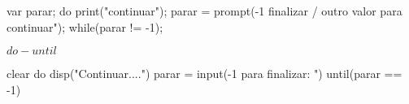 \documentclass[a4paper,11pt]{article}
\def\lthtmlcheckvsize{\ifdim\ht\sizebox<\vsize 
  \ifdim\wd\sizebox<\hsize\expandafter\hfill\fi \expandafter\vfill
  \else\expandafter\vss\fi}%
\begin{document}
{\newpage\clearpage
{}%
\begin{code}
var parar;
do{
	print("continuar");
	parar = prompt(-1 finalizar / outro valor para continuar");
}
while(parar != -1);
\end{code}%
\lthtmlfigureZ
\lthtmlcheckvsize\clearpage}

{\newpage\clearpage
{}%
$do-until$%
\lthtmlindisplaymathZ
\lthtmlcheckvsize\clearpage}

{\newpage\clearpage
{}%
\begin{code}
clear
do
  disp("Continuar....")
  parar = input(-1 para finalizar: ")
until(parar == -1)
\end{code}%
\lthtmlfigureZ
\lthtmlcheckvsize\clearpage}

\end{document}
